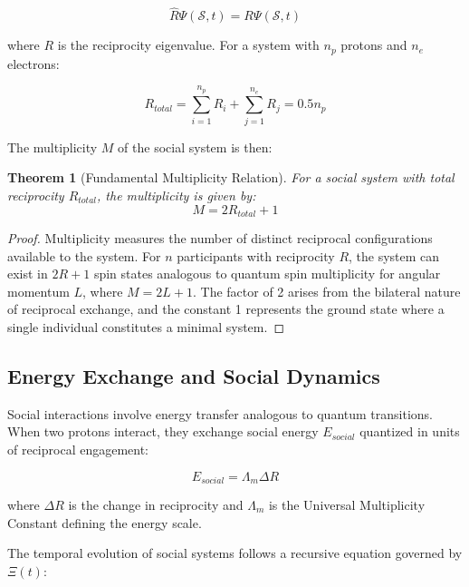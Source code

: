 \documentclass[11pt,a4paper]{article}
\newtheorem{theorem}{Theorem}
\begin{document}
\begin{equation}
\hat{R}\Psi(\mathcal{S}, t) = R \Psi(\mathcal{S}, t)
\end{equation}

where $R$ is the reciprocity eigenvalue. For a system with $n_p$ protons and $n_e$ electrons:

\begin{equation}
R_{total} = \sum_{i=1}^{n_p} R_i + \sum_{j=1}^{n_e} R_j = 0.5 n_p
\end{equation}

The multiplicity $M$ of the social system is then:

\begin{theorem}[Fundamental Multiplicity Relation]
For a social system with total reciprocity $R_{total}$, the multiplicity is given by:
\begin{equation}
M = 2R_{total} + 1
\end{equation}
\end{theorem}

\begin{proof}
Multiplicity measures the number of distinct reciprocal configurations available to the system. For $n$ participants with reciprocity $R$, the system can exist in $2R + 1$ spin states analogous to quantum spin multiplicity for angular momentum $L$, where $M = 2L + 1$. The factor of 2 arises from the bilateral nature of reciprocal exchange, and the constant 1 represents the ground state where a single individual constitutes a minimal system.
\end{proof}

\subsection{Energy Exchange and Social Dynamics}

Social interactions involve energy transfer analogous to quantum transitions. When two protons interact, they exchange social energy $E_{social}$ quantized in units of reciprocal engagement:

\begin{equation}
E_{social} = \Lambda_m \Delta R
\end{equation}

where $\Delta R$ is the change in reciprocity and $\Lambda_m$ is the Universal Multiplicity Constant defining the energy scale.

The temporal evolution of social systems follows a recursive equation governed by $\Xi(t)$:
\end{document}
